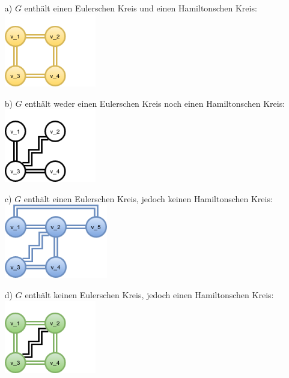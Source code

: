 \documentclass{scrartcl}
\begin{document}
\begin{itemize}
    \item[a)] $G$ enthält einen {\color{YellowOrange}Eulerschen}
        Kreis und einen {\color{YellowOrange}Hamiltonschen} Kreis: \\
        \includegraphics[width=4cm]{eul_ham.png}
    \item[b)] $G$ enthält weder einen
        {\color{blue}Eulerschen} Kreis noch einen
        {\color{ForestGreen}Hamiltonschen} Kreis: \\
        \includegraphics[width=4cm]{neul_nham.png}
    \item[c)] $G$ enthält einen
        {\color{blue}Eulerschen} Kreis, jedoch keinen
        {\color{ForestGreen}Hamiltonschen} Kreis: \\
        \includegraphics[width=4.5cm]{eul_nham.png}
    \item[d)] $G$ enthält
        keinen {\color{blue}Eulerschen} Kreis, jedoch einen
        {\color{ForestGreen}Hamiltonschen} Kreis: \\
        \includegraphics[width=4cm]{neul_ham.png}
\end{itemize}

\end{document}
